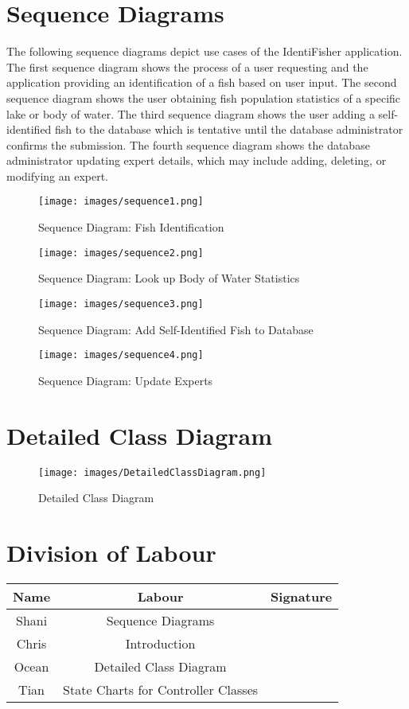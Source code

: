 \documentclass[]{article}
\begin{document}
\section{Sequence Diagrams}
\label{sec:sequence_diagrams}
The following sequence diagrams depict use cases of the IdentiFisher application. The first sequence diagram shows the process of a user requesting and the application providing an identification of a fish based on user input. The second sequence diagram shows the user obtaining fish population statistics of a specific lake or body of water. The third sequence diagram shows the user adding a self-identified fish to the database which is tentative until the database administrator confirms the submission. The fourth sequence diagram shows the database administrator updating expert details, which may include adding, deleting, or modifying an expert.
\begin{figure}[H]
	\texttt{[image: images/sequence1.png]}
	\caption{Sequence Diagram: Fish Identification}
\end{figure}
\begin{figure}[H]
	\texttt{[image: images/sequence2.png]}
	\caption{Sequence Diagram: Look up Body of Water Statistics}
\end{figure}
\begin{figure}[H]
	\texttt{[image: images/sequence3.png]}
	\caption{Sequence Diagram: Add Self-Identified Fish to Database}
\end{figure}
\begin{figure}[H]
	\texttt{[image: images/sequence4.png]}
	\caption{Sequence Diagram: Update Experts}
\end{figure}

\section{Detailed Class Diagram}
\label{sec:detailed_class_diagram}
\begin{figure}[H]
	\texttt{[image: images/DetailedClassDiagram.png]}
	\caption{Detailed Class Diagram}
\end{figure}

\vfill
\listoffigures

\appendix
\section{Division of Labour}
\label{sec:division_of_labour}
\begin{center}
\begin{tabular}{ |c|c|c| }
 \hline
 Name & Labour & Signature \\ \hline
 Shani & Sequence Diagrams & \\
 Chris & Introduction  &  \\
 Ocean &  Detailed Class Diagram &  \\
 Tian & State Charts for Controller Classes & \\
 \hline
\end{tabular}
\end{center}
\end{document}
